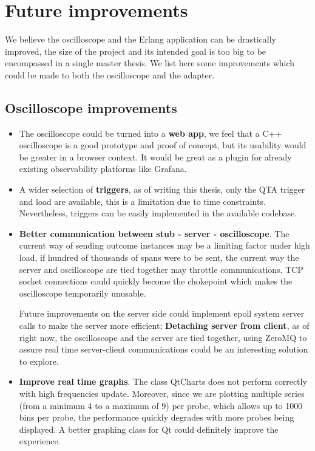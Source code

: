     \section{Future improvements}
        We believe the oscilloscope and the Erlang application can be drastically improved, the size of the project and its intended goal is too big to be encompassed in a single master thesis. We list here some improvements which could be made to both the oscilloscope and the adapter.
        \subsection{Oscilloscope improvements}
           \begin{itemize}
            
                \item The oscilloscope could be turned into a \textbf{web app}, we feel that a C++ oscilloscope is a good prototype and proof of concept, but its usability would be greater in a browser context. It would be great as a plugin for already existing observability platforms like Grafana.
            
                \item A wider selection of \textbf{triggers}, as of writing this thesis, only the QTA trigger and load are available, this is a limitation due to time constraints. Nevertheless, triggers can be easily implemented in the available codebase.
            
                \item \textbf{Better communication between stub - server - oscilloscope}. The current way of sending outcome instances may be a limiting factor under high load, if hundred of thousands of spans were to be sent, the current way the server and oscilloscope are tied together may throttle communications. TCP socket connections could quickly become the chokepoint which makes the oscilloscope temporarily unusable.

            Future improvements on the server side could implement epoll system server calls to make the server more efficient; \textbf{Detaching server from client}, as of right now, the oscilloscope and the server are tied together, using ZeroMQ to assure real time server-client communications could be an interesting solution to explore.

                \item \textbf{Improve real time graphs}. The class QtCharts does not perform correctly with high frequencies update. Moreover, since we are plotting multiple series (from a minimum 4 to a maximum of 9) per probe, which allows up to 1000 bins per probe, the performance quickly degrades with more probes being displayed. A better graphing class for Qt could definitely improve the experience.


\end{itemize}
